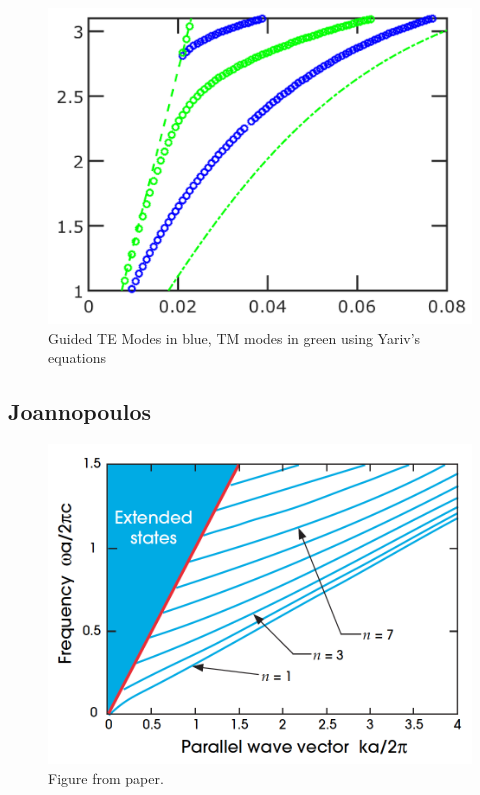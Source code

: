 \documentclass[12pt]{article}
\numberwithin{equation}{section}
\begin{document}
\begin{figure}[H]
\centering 
\vspace{-10pt}
\includegraphics[scale=.27]{Figures/PalaModesWaveguide}
\caption{Guided TE Modes in blue, TM modes in green using Yariv's equations}
\vspace{-10pt}
\end{figure}


\subsection{Joannopoulos}

\begin{figure}[H]
\centering 
\vspace{-10pt}
\includegraphics[scale=.4]{Figures/Joannopoulos}
\caption{Figure from paper.}
\vspace{-10pt}
\end{figure}
\end{document}
